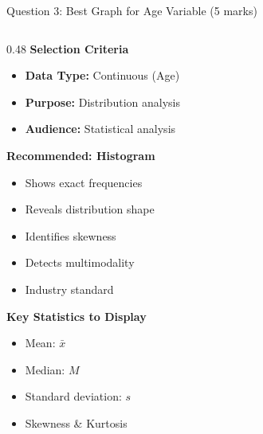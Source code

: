 \documentclass[aspectratio=169]{beamer}
\begin{document}
\begin{frame}{Question 3: Best Graph for Age Variable (5 marks)}
\begin{columns}[T]
        \begin{column}{0.48\textwidth}
            \textbf{Selection Criteria}

            \begin{itemize}
                \item \textbf{Data Type:} Continuous (Age)
                \item \textbf{Purpose:} Distribution analysis
                \item \textbf{Audience:} Statistical analysis
            \end{itemize}

            \vspace{0.3cm}

            \textbf{Recommended: Histogram}

            \begin{itemize}
                \item[$\checkmark$] Shows exact frequencies
                \item[$\checkmark$] Reveals distribution shape
                \item[$\checkmark$] Identifies skewness
                \item[$\checkmark$] Detects multimodality
                \item[$\checkmark$] Industry standard
            \end{itemize}

            \vspace{0.3cm}

            \textbf{Key Statistics to Display}
            \begin{itemize}
                \item Mean: $\bar{x}$
                \item Median: $M$
                \item Standard deviation: $s$
                \item Skewness \& Kurtosis
            \end{itemize}
        \end{column}
    \end{columns}
\end{frame}
\end{document}
